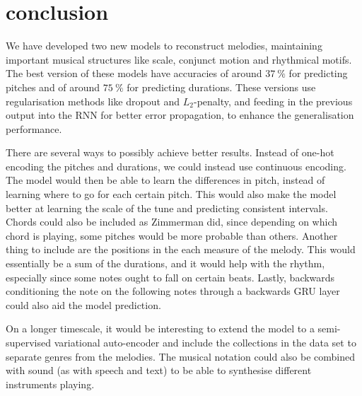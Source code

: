\section{conclusion}
\label{sec:conclusion}

We have developed two new models to reconstruct melodies, maintaining important musical structures like scale, conjunct motion and rhythmical motifs. 
The best version of these models have accuracies of around $\SI{37}{\%}$ for predicting pitches and of around $\SI{75}{\%}$ for predicting durations.
These versions use regularisation methods like dropout and $L_2$-penalty, and feeding in the previous output into the RNN for better error propagation, to enhance the generalisation performance. 

There are several ways to possibly achieve better results.
Instead of one-hot encoding the pitches and durations, we could instead use continuous encoding.
The model would then be able to learn the differences in pitch, instead of learning where to go for each certain pitch.
This would also make the model better at learning the scale of the tune and predicting consistent intervals. 
Chords could also be included as Zimmerman \cite{Zimmerman2016} did, since depending on which chord is playing, some pitches would be more probable than others.
Another thing to include are the positions in the each measure of the melody. This would essentially be a sum of the durations, and it would help with the rhythm, especially since some notes ought to fall on certain beats.
Lastly, backwards conditioning the note on the following notes through a backwards GRU layer could also aid the model prediction.

On a longer timescale, it would be interesting to extend the model to a semi-supervised variational auto-encoder and include the collections in the data set to separate genres from the melodies.
The musical notation could also be combined with sound (as with speech and text) to be able to synthesise different instruments playing.
